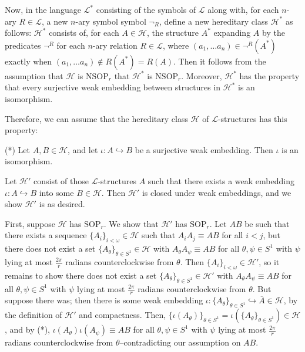 \documentclass{amsart}
\theoremstyle{definition}
\theoremstyle{remark}
\numberwithin{equation}{section}
\begin{document}
Now, in the language $\mathcal{L}^{*}$ consisting of the symbols of $\mathcal{L}$ along with, for each $n$-ary $R \in \mathcal{L}$, a new $n$-ary symbol symbol $\neg_{R}$, define a new hereditary class $\mathcal{H}^{*}$ as follows: $\mathcal{H}^{*}$ consists of, for each $A \in \mathcal{H}$, the structure $A^{*}$ expanding $A$ by the predicates $\neg^{R}$ for each $n$-ary relation $R \in \mathcal{L}$, where $(a_{1}, \ldots a_{n}) \in \neg^{R}(A^{*})$ exactly when $(a_{1}, \ldots a_{n}) \notin R(A^{*})= R(A)$. Then it follows from the assumption that $\mathcal{H}$ is $\mathrm{NSOP}_{r}$ that $\mathcal{H}^{*}$ is $\mathrm{NSOP}_{r}$. Moreover, $\mathcal{H}^{*}$ has the property that every surjective weak embedding between structures in $\mathcal{H}^{*}$ is an isomorphism.

Therefore, we can assume that the hereditary class $\mathcal{H}$ of $\mathcal{L}$-structures has this property:

(*) Let $A, B \in \mathcal{H}$, and let $\iota: A \hookrightarrow B$ be a surjective weak embedding. Then $\iota$ is an isomorphism.

Let $\mathcal{H}'$ consist of those $\mathcal{L}$-structures $A$ such that there exists a weak embedding $\iota: A \hookrightarrow B$ into some $B \in \mathcal{H}$. Then $\mathcal{H}'$ is closed under weak embeddings, and we show $\mathcal{H}'$ is as desired.

First, suppose $\mathcal{H}$ has $\mathrm{SOP}_{r}$. We show that $\mathcal{H}'$ has $\mathrm{SOP}_{r}$. Let $AB$ be such that there exists a sequence $\{ A_{i}\}_{i < \omega} \in \mathcal{H}$ such that $A_{i}A_{j} \equiv AB$ for all $i < j$, but there does not exist a set $\{ A_{\theta}\}_{\theta \in S^{1}} \in \mathcal{H}$ with $A_{\theta}A_{\psi} \equiv AB$ for all $\theta, \psi \in S^{1}$ with $\psi$ lying at most $\frac{2\pi}{r}$ radians counterclockwise from $\theta$. Then $\{ A_{i}\}_{i < \omega} \in \mathcal{H}'$, so it remains to show there does not exist a set $\{ A_{\theta}\}_{\theta \in S^{1}} \in \mathcal{H}'$ with $A_{\theta}A_{\psi} \equiv AB$ for all $\theta, \psi \in S^{1}$ with $\psi$ lying at most $\frac{2\pi}{r}$ radians counterclockwise from $\theta$. But suppose there was; then there is some weak embedding $\iota: \{ A_{\theta}\}_{\theta \in S^{1}} \hookrightarrow \overline{A} \in \mathcal{H}$, by the definition of $\mathcal{H}'$ and compactness. Then, $ \{ \iota(A_{\theta})\}_{\theta \in S^{1}}=\iota(\{ A_{\theta}\}_{\theta \in S^{1}}) \in \mathcal{H}$ , and by (*), $\iota(A_{\theta})\iota(A_{\psi}) \equiv AB$ for all $\theta, \psi \in S^{1}$ with $\psi$ lying at most $\frac{2\pi}{r}$ radians counterclockwise from $\theta$--contradicting our assumption on $AB$.
\end{document}
